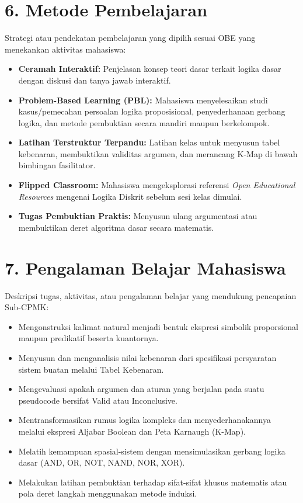 \documentclass[12pt,a4paper]{article}
\begin{document}
\section*{6. Metode Pembelajaran}

Strategi atau pendekatan pembelajaran yang dipilih sesuai OBE yang menekankan aktivitas mahasiswa:

\begin{itemize}[leftmargin=*]
  \item \textbf{Ceramah Interaktif:} Penjelasan konsep teori dasar terkait logika dasar dengan diskusi dan tanya jawab interaktif.
  \item \textbf{Problem-Based Learning (PBL):} Mahasiswa menyelesaikan studi kasus/pemecahan persoalan logika proposisional, penyederhanaan gerbang logika, dan metode pembuktian secara mandiri maupun berkelompok.
  \item \textbf{Latihan Terstruktur Terpandu:} Latihan kelas untuk menyusun tabel kebenaran, membuktikan validitas argumen, dan merancang K-Map di bawah bimbingan fasilitator.
  \item \textbf{Flipped Classroom:} Mahasiswa mengeksplorasi referensi \textit{Open Educational Resources} mengenai Logika Diskrit sebelum sesi kelas dimulai.
  \item \textbf{Tugas Pembuktian Praktis:} Menyusun ulang argumentasi atau membuktikan deret algoritma dasar secara matematis.
\end{itemize}

\vspace{0.5cm}

\section*{7. Pengalaman Belajar Mahasiswa}

Deskripsi tugas, aktivitas, atau pengalaman belajar yang mendukung pencapaian Sub-CPMK:

\begin{itemize}[leftmargin=*]
  \item Mengonstruksi kalimat natural menjadi bentuk ekspresi simbolik proporsional maupun predikatif beserta kuantornya.
  \item Menyusun dan menganalisis nilai kebenaran dari spesifikasi persyaratan sistem buatan melalui Tabel Kebenaran.
  \item Mengevaluasi apakah argumen dan aturan yang berjalan pada suatu pseudocode bersifat Valid atau Inconclusive.
  \item Mentransformasikan rumus logika kompleks dan menyederhanakannya melalui ekspresi Aljabar Boolean dan Peta Karnaugh (K-Map).
  \item Melatih kemampuan spasial-sistem dengan mensimulasikan gerbang logika dasar (AND, OR, NOT, NAND, NOR, XOR).
  \item Melakukan latihan pembuktian terhadap sifat-sifat khusus matematis atau pola deret langkah menggunakan metode induksi.
\end{itemize}
\end{document}
